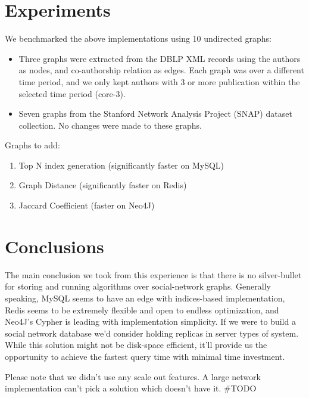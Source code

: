\section{Experiments}
We benchmarked the above implementations using 10 undirected graphs:
\begin{itemize}
\item Three graphs were extracted from the DBLP XML records using the authors as
nodes, and co-authorship relation as edges. Each graph was over a different
time period, and  we only kept authors with 3 or more publication within the
selected time period (core-3). 

\item Seven graphs from the Stanford Network Analysis Project (SNAP) dataset
  collection. No changes were made to these graphs.
\end{itemize}

Graphs to add:
\begin{enumerate}
\item Top N index generation (significantly faster on MySQL)
\item Graph Distance (significantly faster on Redis)
\item Jaccard Coefficient (faster on Neo4J)
\end{enumerate}

\section{Conclusions}
The main conclusion we took from this experience is that there is no silver-bullet for storing and running algorithms over social-network graphs. Generally speaking, MySQL seems to have an edge with indices-based implementation, Redis seems to be extremely flexible and open to endless optimization, and Neo4J's Cypher is leading with implementation simplicity.
If we were to build a social network database we'd consider holding replicas in server types of system. While this solution might not be disk-space efficient, it'll provide us the opportunity to achieve the fastest query time with minimal time investment.

Please note that we didn't use any scale out features. A large network implementation can't pick a solution which doesn't have it. \#TODO
